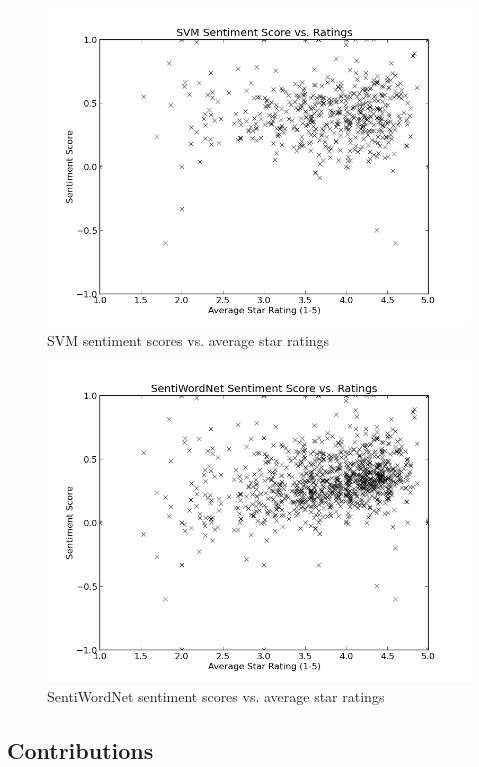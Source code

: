 \documentclass{acm_proc_article-sp}
\begin{document}
\begin{figure}[!h]
\centering
\includegraphics[scale=0.4]{svm.png}
\caption{SVM sentiment scores vs. average star ratings}
\label{fig:myfig1}
\end{figure}

\begin{figure}[!h]
\centering
\includegraphics[scale=0.4]{swn.png}
\caption{SentiWordNet sentiment scores vs. average star ratings}
\label{fig:myfig2}
\end{figure}


\subsection{Contributions}



\balancecolumns
\end{document}
